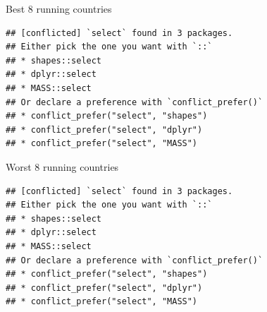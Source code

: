 \documentclass[ignorenonframetext,]{beamer}
\newenvironment{Shaded}{\begin{snugshade}}{\end{snugshade}}
\newcommand{\DataTypeTok}[1]{\textcolor[rgb]{0.13,0.29,0.53}{#1}}
\newcommand{\DecValTok}[1]{\textcolor[rgb]{0.00,0.00,0.81}{#1}}
\newcommand{\FloatTok}[1]{\textcolor[rgb]{0.00,0.00,0.81}{#1}}
\newcommand{\KeywordTok}[1]{\textcolor[rgb]{0.13,0.29,0.53}{\textbf{#1}}}
\newcommand{\NormalTok}[1]{#1}
\newcommand{\OperatorTok}[1]{\textcolor[rgb]{0.81,0.36,0.00}{\textbf{#1}}}
\newcommand{\StringTok}[1]{\textcolor[rgb]{0.31,0.60,0.02}{#1}}
\begin{document}
\begin{frame}[fragile]{Best 8 running countries}
\protect\hypertarget{best-8-running-countries}{}

\begin{Shaded}
\end{Shaded}

\begin{verbatim}
## [conflicted] `select` found in 3 packages.
## Either pick the one you want with `::` 
## * shapes::select
## * dplyr::select
## * MASS::select
## Or declare a preference with `conflict_prefer()`
## * conflict_prefer("select", "shapes")
## * conflict_prefer("select", "dplyr")
## * conflict_prefer("select", "MASS")
\end{verbatim}

\end{frame}

\begin{frame}[fragile]{Worst 8 running countries}
\protect\hypertarget{worst-8-running-countries}{}

\begin{Shaded}
\end{Shaded}

\begin{verbatim}
## [conflicted] `select` found in 3 packages.
## Either pick the one you want with `::` 
## * shapes::select
## * dplyr::select
## * MASS::select
## Or declare a preference with `conflict_prefer()`
## * conflict_prefer("select", "shapes")
## * conflict_prefer("select", "dplyr")
## * conflict_prefer("select", "MASS")
\end{verbatim}

\end{frame}
\end{document}

